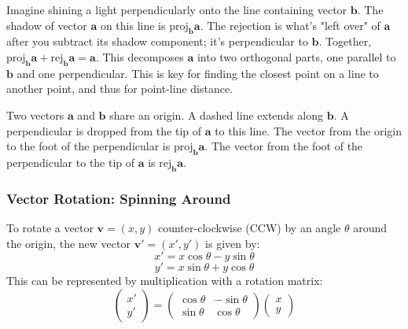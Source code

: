 \begin{intuition}
\label{intuition:A.1.1.projection_rejection}
Imagine shining a light perpendicularly onto the line containing vector $\mathbf{b}$. The shadow of vector $\mathbf{a}$ on this line is $\text{proj}_{\mathbf{b}} \mathbf{a}$.
The rejection is what's "left over" of $\mathbf{a}$ after you subtract its shadow component; it's perpendicular to $\mathbf{b}$.
Together, $\text{proj}_{\mathbf{b}} \mathbf{a} + \text{rej}_{\mathbf{b}} \mathbf{a} = \mathbf{a}$. This decomposes $\mathbf{a}$ into two orthogonal parts, one parallel to $\mathbf{b}$ and one perpendicular.
This is key for finding the closest point on a line to another point, and thus for point-line distance.
\end{intuition}

\begin{visualexample}
\label{vis:A.1.1.projection_rejection}
Two vectors $\mathbf{a}$ and $\mathbf{b}$ share an origin. A dashed line extends along $\mathbf{b}$. A perpendicular is dropped from the tip of $\mathbf{a}$ to this line. The vector from the origin to the foot of the perpendicular is $\text{proj}_{\mathbf{b}} \mathbf{a}$. The vector from the foot of the perpendicular to the tip of $\mathbf{a}$ is $\text{rej}_{\mathbf{b}} \mathbf{a}$.
\end{visualexample}

\subsubsection{Vector Rotation: Spinning Around}
\label{sssec:A.1.1.7}

\begin{definition}
\label{def:A.1.1.rotation}
To rotate a vector $\mathbf{v}=(x, y)$ counter-clockwise (CCW) by an angle $\theta$ around the origin, the new vector $\mathbf{v}'=(x', y')$ is given by:
$$ x' = x \cos\theta - y \sin\theta $$
$$ y' = x \sin\theta + y \cos\theta $$
This can be represented by multiplication with a rotation matrix:
$$ \begin{pmatrix} x' \\ y' \end{pmatrix} = \begin{pmatrix} \cos\theta & -\sin\theta \\ \sin\theta & \cos\theta \end{pmatrix} \begin{pmatrix} x \\ y \end{pmatrix} $$
\end{definition}

